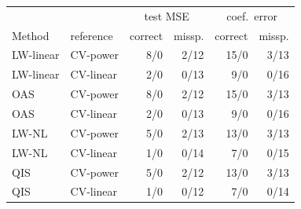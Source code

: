 \begin{tabular}{@{}llrrrr@{}}
\toprule
 & & \multicolumn{2}{c}{test MSE} & \multicolumn{2}{c}{coef.\ error} \\
Method & reference & correct & missp. & correct & missp. \\
\midrule
LW-linear & CV-power & 8/0 & 2/12 & 15/0 & 3/13 \\
LW-linear & CV-linear & 2/0 & 0/13 & 9/0 & 0/16 \\
OAS & CV-power & 8/0 & 2/12 & 15/0 & 3/13 \\
OAS & CV-linear & 2/0 & 0/13 & 9/0 & 0/16 \\
LW-NL & CV-power & 5/0 & 2/13 & 13/0 & 3/13 \\
LW-NL & CV-linear & 1/0 & 0/14 & 7/0 & 0/15 \\
QIS & CV-power & 5/0 & 2/12 & 13/0 & 3/13 \\
QIS & CV-linear & 1/0 & 0/12 & 7/0 & 0/14 \\
\bottomrule
\end{tabular}